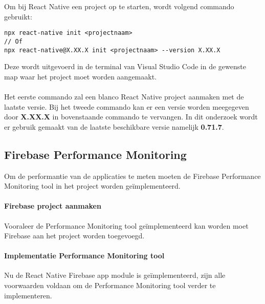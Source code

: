 Om bij React Native een project op te starten, wordt volgend commando gebruikt: 
\begin{verbatim}
npx react-native init <projectnaam>
// Of
npx react-native@X.XX.X init <projectnaam> --version X.XX.X
\end{verbatim}
Deze wordt uitgevoerd in de terminal van Visual Studio Code in de gewenste map waar 
het project moet worden aangemaakt.
\\\\
Het eerste commando zal een blanco React Native project aanmaken met de laatste versie. Bij het tweede commando
kan er een versie worden meegegeven door \textbf{X.XX.X} in bovenstaande commando te vervangen.
In dit onderzoek wordt er gebruik gemaakt van de laatste beschikbare versie namelijk \textbf{0.71.7}.

\subsection{Firebase Performance Monitoring}
Om de performantie van de applicaties te meten moeten de 
Firebase Performance Monitoring tool in het project worden geïmplementeerd.

\paragraph{Firebase project aanmaken}
Vooraleer de Performance Monitoring tool geïmplementeerd kan worden moet Firebase 
aan het project worden toegevoegd.



\paragraph{Implementatie Performance Monitoring tool}
Nu de React Native Firebase app module is geïmplementeerd, zijn alle voorwaarden voldaan om de 
Performance Monitoring tool verder te implementeren.


